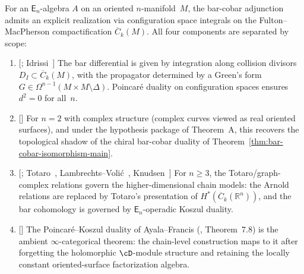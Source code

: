 \begin{theorem}\label{thm:en-koszul-duality-conc}
For an $\mathsf{E}_n$-algebra $A$ on an oriented $n$-manifold~$M$,
the bar-cobar adjunction admits an explicit realization via
configuration space integrals on the Fulton--MacPherson
compactification $\overline{C}_k(M)$. All four components
are separated by scope:
\begin{enumerate}[label=\textup{(\roman*)}]
\item \textup{[\ClaimStatusProvedElsewhere; Idrissi~\cite{Idrissi22}]}
 The bar differential is given by integration along collision
 divisors $D_I \subset \overline{C}_k(M)$, with the propagator
 determined by a Green's form $G \in \Omega^{n-1}(M \times M
 \setminus \Delta)$. Poincar\'e duality on configuration spaces
 ensures $d^2 = 0$ for all~$n$.
\item \textup{[\ClaimStatusConditional]}
 For $n = 2$ with complex structure \textup{(}complex curves viewed as
 real oriented surfaces\textup{)}, and under the hypothesis package of
 Theorem~A, this recovers the topological shadow of the chiral
 bar-cobar duality of
 Theorem~\textup{\ref{thm:bar-cobar-isomorphism-main}}.
\item \textup{[\ClaimStatusProvedElsewhere;
 Totaro~\cite{Totaro96}, Lambrechts--Voli\'c~\cite{LambrechtsVolic14},
 Knudsen~\cite{Knudsen18}]}
 For $n \geq 3$, the Totaro/graph-complex relations govern the
 higher-dimensional chain models:
 the Arnold relations are replaced by Totaro's presentation of
 $H^*(\overline{C}_k(\mathbb{R}^n))$, and the bar cohomology is
 governed by $\mathsf{E}_n$-operadic Koszul duality.
\item \textup{[\ClaimStatusProvedElsewhere]}
 The Poincar\'e--Koszul duality of Ayala--Francis
\textup{(}\cite{AF15}, Theorem~7.8\textup{)} is the ambient
$\infty$-categorical theorem: the chain-level construction maps to it
after forgetting the holomorphic $\cD$-module structure and retaining
the locally constant oriented-surface factorization algebra.
\end{enumerate}
\end{theorem}

